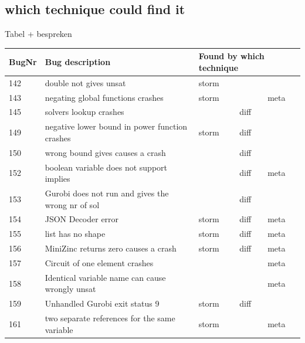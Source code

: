 \subsection{which technique could find it}
Tabel + bespreken
\begin{table}[]
	\centering
	\begin{tabular}{lllll}
		BugNr & Bug description                                           & \multicolumn{3}{l}{Found by which technique} \\ \toprule
		142   & double not gives unsat                                    & storm          &              &              \\
		143   & negating global functions crashes                         & storm          &              & meta         \\
		145   & solvers lookup crashes                                    &                & diff         &              \\
		149   & negative lower bound in power function crashes            & storm          & diff         &              \\
		150   & wrong bound gives causes a crash                          &                & diff         &              \\
		152   & boolean variable does not support implies                 &                & diff         & meta         \\
		153   & Gurobi does not run and gives the wrong nr of sol         &                & diff         &              \\
		154   & JSON Decoder error                                        & storm          & diff         & meta         \\
		155   & list has no shape                                         & storm          & diff         & meta         \\
		156   & MiniZinc returns zero causes a crash                      & storm          & diff         & meta         \\
		157   & Circuit of one element crashes                            &                &              & meta         \\
		158   & Identical variable name can cause wrongly unsat           &                &              & meta         \\
		159   & Unhandled Gurobi exit status 9                            & storm          & diff         &              \\
		161   & two separate references for the same variable             & storm          &              & meta         \\

\end{tabular}
\end{table}

